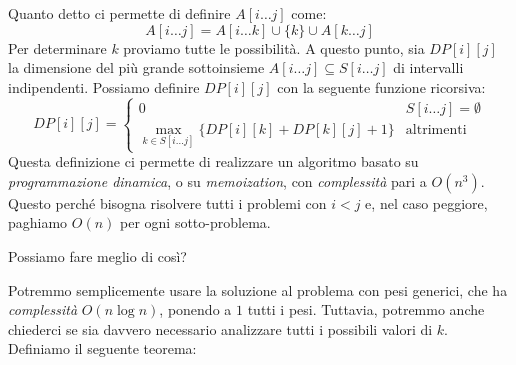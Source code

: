 \noindent
Quanto detto ci permette di definire $A[i\dots j]$ come:
\[A[i\dots j]=A[i\dots k]\cup\{k\}\cup A[k\dots j]\]
Per determinare $k$ proviamo tutte le possibilità. A questo punto, sia $DP[i][j]$
la dimensione del più grande sottoinsieme $A[i\dots j]\subseteq S[i\dots j]$ di
intervalli indipendenti. Possiamo definire $DP[i][j]$ con la seguente funzione
ricorsiva:
\[DP[i][j]=\begin{cases}
    0 & S[i\dots j]=\emptyset\\
    \max_{k\in S[i\dots j]}\{DP[i][k]+DP[k][j]+1\} & \text{altrimenti}
\end{cases}\]
Questa definizione ci permette di realizzare un algoritmo basato su
\emph{programmazione dinamica}, o su \emph{memoization}, con \emph{complessità}
pari a $O(n^3)$. Questo perché bisogna risolvere tutti i problemi con $i<j$ e,
nel caso peggiore, paghiamo $O(n)$ per ogni sotto-problema.

\bigskip\noindent
Possiamo fare meglio di così?

Potremmo semplicemente usare la soluzione al problema con pesi generici, che
ha \emph{complessità} $O(n\log n)$, ponendo a $1$ tutti i pesi. Tuttavia,
potremmo anche chiederci se sia davvero necessario analizzare tutti i
possibili valori di $k$. Definiamo il seguente teorema:

